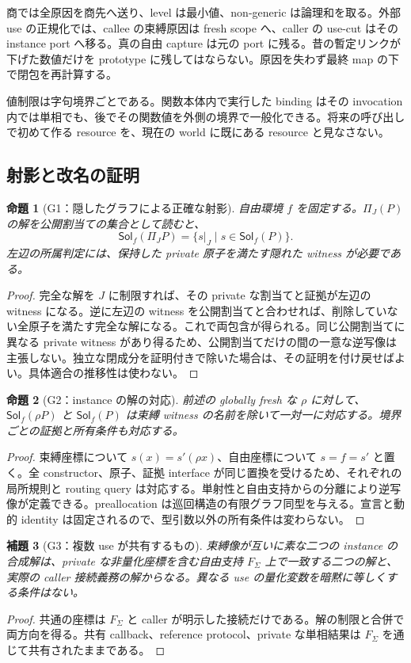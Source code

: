 \documentclass[11pt,a4paper]{article}
\newtheorem{theorem}{命題}[section]
\newtheorem{lemma}[theorem]{補題}
\theoremstyle{remark}
\newcommand{\Sol}{\mathsf{Sol}}
\begin{document}
商では全原因を商先へ送り、level は最小値、non-generic は論理和を取る。外部 use の正規化では、callee の束縛原因は fresh scope へ、caller の use-cut はその instance port へ移る。真の自由 capture は元の port に残る。昔の暫定リンクが下げた数値だけを prototype に残してはならない。原因を失わず最終 map の下で閉包を再計算する。

値制限は字句境界ごとである。関数本体内で実行した binding はその invocation 内では単相でも、後でその関数値を外側の境界で一般化できる。将来の呼び出しで初めて作る resource を、現在の world に既にある resource と見なさない。

\subsection{射影と改名の証明}

\begin{theorem}[G1：隠したグラフによる正確な射影]
自由環境 $f$ を固定する。$\Pi_J(P)$ の解を公開割当ての集合として読むと、
\[
 \Sol_f(\Pi_J P)=\{s|_J\mid s\in\Sol_f(P)\}.
\]
左辺の所属判定には、保持した private 原子を満たす隠れた witness が必要である。
\end{theorem}
\begin{proof}
完全な解を $J$ に制限すれば、その private な割当てと証拠が左辺の witness になる。逆に左辺の witness を公開割当てと合わせれば、削除していない全原子を満たす完全な解になる。これで両包含が得られる。同じ公開割当てに異なる private witness があり得るため、公開割当てだけの間の一意な逆写像は主張しない。独立な閉成分を証明付きで除いた場合は、その証明を付け戻せばよい。具体適合の推移性は使わない。
\end{proof}

\begin{theorem}[G2：instance の解の対応]
前述の globally fresh な $\rho$ に対して、$\Sol_f(\rho P)$ と $\Sol_f(P)$ は束縛 witness の名前を除いて一対一に対応する。境界ごとの証拠と所有条件も対応する。
\end{theorem}
\begin{proof}
束縛座標について $s(x)=s'(\rho x)$、自由座標について $s=f=s'$ と置く。全 constructor、原子、証拠 interface が同じ置換を受けるため、それぞれの局所規則と routing query は対応する。単射性と自由支持からの分離により逆写像が定義できる。preallocation は巡回構造の有限グラフ同型を与える。宣言と動的 identity は固定されるので、型引数以外の所有条件は変わらない。
\end{proof}

\begin{lemma}[G3：複数 use が共有するもの]
束縛像が互いに素な二つの instance の合成解は、private な非量化座標を含む自由支持 $F_\Sigma$ 上で一致する二つの解と、実際の caller 接続義務の解からなる。異なる use の量化変数を暗黙に等しくする条件はない。
\end{lemma}
\begin{proof}
共通の座標は $F_\Sigma$ と caller が明示した接続だけである。解の制限と合併で両方向を得る。共有 callback、reference protocol、private な単相結果は $F_\Sigma$ を通じて共有されたままである。
\end{proof}
\end{document}
